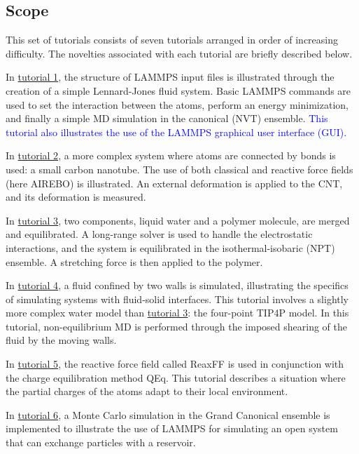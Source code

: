 \documentclass[9pt,tutorial]{livecoms}
\begin{document}
\subsection{Scope}

This set of tutorials consists of seven tutorials arranged in order of increasing difficulty. The novelties associated with each tutorial are briefly described below.

In \hyperref[lennard-jones-label]{tutorial 1}, the structure of LAMMPS input files is illustrated through the creation of a simple Lennard-Jones fluid system. Basic LAMMPS commands are used to set the interaction between the atoms, perform an energy minimization, and finally a simple MD simulation in the canonical (NVT) ensemble. \textcolor{blue}{This tutorial also illustrates the use of the LAMMPS graphical user interface (GUI).}

In \hyperref[carbon-nanotube-label]{tutorial 2}, a more complex system where atoms are connected by bonds is used: a small carbon nanotube. The use of both classical and reactive force fields (here AIREBO) is illustrated. An external deformation is applied to the CNT, and its deformation is measured.

In \hyperref[all-atoms-label]{tutorial 3}, two components, liquid water and a polymer molecule, are merged and equilibrated. A long-range solver is used to handle the electrostatic interactions, and the system is equilibrated in the isothermal-isobaric (NPT) ensemble. A stretching force is then applied to the polymer.

In \hyperref[sheared-confined-label]{tutorial 4}, a fluid confined by two walls is simulated, illustrating the specifics of simulating systems with fluid-solid interfaces. This tutorial involves a slightly more complex water model than \hyperref[all-atoms-label]{tutorial 3}: the four-point TIP4P model. In this tutorial, non-equilibrium MD is performed through the imposed shearing of the fluid by the moving walls.

In \hyperref[reactive-silicon-dioxide-label]{tutorial 5}, the reactive force field called ReaxFF is used in conjunction with the charge equilibration method QEq. This tutorial describes a situation where the partial charges of the atoms adapt to their local environment.

In \hyperref[gcmc-silica-label]{tutorial 6}, a Monte Carlo simulation in the Grand Canonical ensemble is implemented to illustrate the use of LAMMPS for simulating an open system that can exchange particles with a reservoir.
\end{document}
